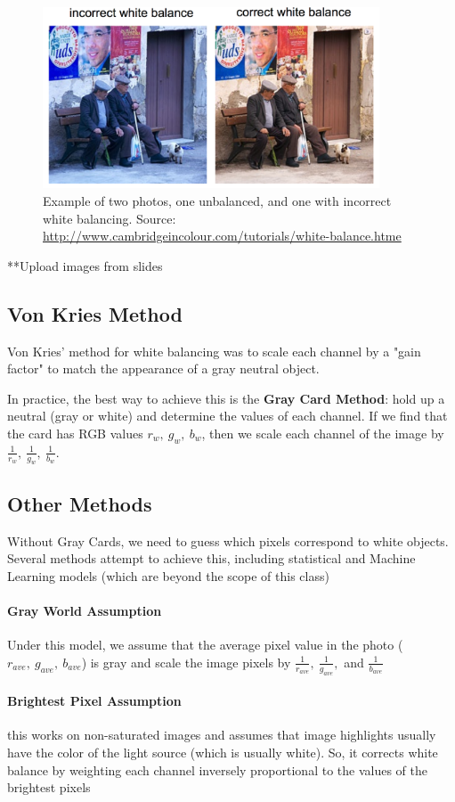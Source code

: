 \documentclass{article}
\begin{document}
\begin{figure}[h!]
\centering
\includegraphics[width=10cm]{wb.png}
\caption{Example of two photos, one unbalanced, and one with incorrect white balancing.  Source: \url{http://www.cambridgeincolour.com/tutorials/white-balance.htme}}
\end{figure}


**Upload images from slides
\subsection{Von Kries Method}
Von Kries' method for white balancing was to scale each channel by a "gain factor" to match the appearance of a gray neutral object.

In practice, the best way to achieve this is the \textbf{Gray Card Method}: hold up a neutral (gray or white) and determine the values of each channel.  If we find that the card has RGB values $r_w,\ g_w,\ b_w$, then we scale each channel of the image by $\frac{1}{r_w},\ \frac{1}{g_w},\ \frac{1}{b_w}$.

\subsection{Other Methods}
Without Gray Cards, we need to guess which pixels correspond to white objects.  Several methods attempt to achieve this, including statistical and Machine Learning models (which are beyond the scope of this class)

\paragraph{Gray World Assumption} Under this model, we assume that the average pixel value in the photo ($r_{ave},\ g_{ave},\ b_{ave}$) is gray and scale the image pixels by $\frac{1}{r_{ave}},\ \frac{1}{g_{ave}},$ and $\frac{1}{b_{ave}}$

\paragraph{Brightest Pixel Assumption} this works on non-saturated images and assumes that image highlights usually have the color of the light source (which is usually white).  So, it corrects white balance by weighting each channel inversely proportional to the values of the brightest pixels
\end{document}
